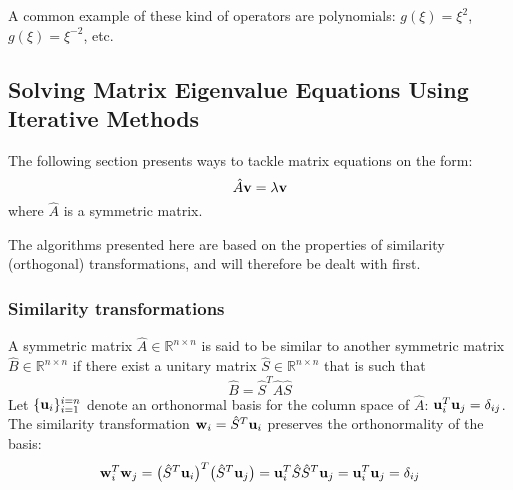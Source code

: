 \documentclass[reprint,english]{revtex4-1}
\begin{document}
A common example of these kind of operators are polynomials: \(g(\xi)=\xi^2\), \(g(\xi)=\xi^{-2}\), etc.

\subsection{Solving Matrix Eigenvalue Equations Using Iterative Methods}
The following section presents ways to tackle matrix equations on the form:
\begin{equation}\label{eq:general_matrix_eigenvalue_problem}
\hat{A}\vb{v}=\lambda\vb{v}
\end{equation}
where \(\hat{A}\) is a symmetric matrix.

The algorithms presented here are based on the properties of similarity (orthogonal) transformations, and will therefore be dealt with first.
\subsubsection{Similarity transformations}
A symmetric matrix \(\hat{A}\in\mathbb{R}^{n\times n}\) is said to be similar to another symmetric matrix \(\hat{B}\in\mathbb{R}^{n\times n}\) if there exist a unitary matrix \(\hat{S}\in\mathbb{R}^{n\times n}\) that is such that
\begin{equation}\label{eq:definition_similar_matrix}
\hat{B}=\hat{S}^T\hat{A}\hat{S}
\end{equation}
Let \(\{\vb{u}_i\}_{i=1}^{i=n}\) denote an orthonormal basis for the column space of \(\hat{A}\): \(\vb{u}_i^T\vb{u}_j=\delta_{ij}\). The similarity transformation \(\vb{w}_i=\hat{S}^T\vb{u}_i\) preserves the orthonormality of the basis:
\[\vb{w}_i^T\vb{w}_j=\big(\hat{S}^T\vb{u}_i\big)^T\big(\hat{S}^T\vb{u}_j\big)=\vb{u}_i^T\hat{S}\hat{S}^T\vb{u}_j=\vb{u}_i^T\vb{u}_j=\delta_{ij}\]
\end{document}
